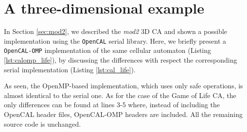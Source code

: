 


\section{A three-dimensional example}
In Section \ref{sec:mod2}, we described the \emph{mod2} 3D CA and
shown a possible implementation using the \verb'OpenCAL' serial
library. Here, we briefly present a \verb'OpenCAL-OMP' implementation
of the same cellular automaton (Listing \ref{lst:calomp_life}), by
discussing the differences with respect the corresponding serial
implementation (Listing \ref{lst:cal_life}).



As seen, the OpenMP-based implementation, which uses only safe
operations, is almost identical to the serial one. As for the case of
the Game of Life CA, the only differences can be found at lines 3-5
where, instead of including the OpenCAL header files, 
OpenCAL-OMP headers are included. All the remaining source code is unchanged.

